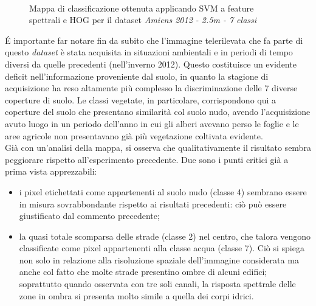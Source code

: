 \begin{figure}[!ht]

\center

\\

\caption{Mappa di classificazione ottenuta applicando SVM a feature spettrali e HOG per il dataset \emph{Amiens 2012 - 2.5m
- 7 classi}}

\label{fig:ClassMap_Amiens2012_2_5m_noroads}

\end{figure}
\clearpage
\'E importante far notare fin da subito che l'immagine telerilevata
che fa parte di questo \emph{dataset} è stata acquisita in situazioni
ambientali e in periodi di tempo diversi da quelle precedenti
(nell'inverno 2012). Questo costituisce un evidente deficit
nell'informazione proveniente dal suolo, in quanto la stagione di
acquisizione ha reso altamente più complesso la discriminazione delle
7 diverse coperture di suolo. Le classi vegetate, in particolare,
corrispondono qui a coperture del suolo che presentano similarità col
suolo nudo, avendo l'acquisizione avuto luogo in un periodo dell'anno
in cui gli alberi avevano perso le foglie e le aree agricole non
presentavano già più vegetazione coltivata evidente.\\

Già con un'analisi della mappa, si osserva che qualitativamente il
risultato sembra peggiorare rispetto all'esperimento precedente. Due
sono i punti critici già a prima vista apprezzabili:

\begin{itemize}

\item i pixel etichettati come appartenenti al suolo nudo (classe 4)
sembrano essere in misura sovrabbondante rispetto ai risultati precedenti: ciò
può essere giustificato dal commento precedente;

\item la quasi totale scomparsa delle strade (classe 2) nel centro,
che talora vengono classificate come pixel appartenenti alla classe
acqua (classe 7). Ciò si spiega non solo in relazione alla risoluzione
spaziale dell'immagine considerata ma anche col fatto che molte strade
presentino ombre di alcuni edifici; soprattutto quando osservata con
tre soli canali, la risposta spettrale delle zone in ombra si presenta
molto simile a quella dei corpi idrici.

\end{itemize}

